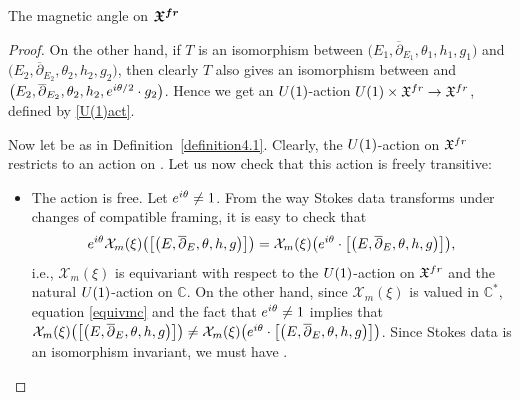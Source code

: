 \documentclass[11pt]{article}
\numberwithin{equation}{section}
\numberwithin{equation}{section}
\newcommand{\MC}{\mathcal{X}_m}
\begin{document}
\begin{subsubsection}{The magnetic angle on $\boldsymbol{\mathfrak{X}^{{\rm fr}}}$}
\begin{proof}
On the other hand, if $T$ is an isomorphism between $\bigl(E_1,\overline{\partial}_{E_1},\theta_1,h_1,g_1\bigr)$ and $\bigl(E_2,\overline{\partial}_{E_2},\theta_2,\allowbreak h_2, g_2\bigr)$, then clearly $T$ also gives an isomorphism between  and $ \smash{\bigl(E_2,\overline{\partial}_{E_2}},\allowbreak\theta_2, \smash{ h_2,{\rm e}^{{\rm i}\theta/2}\cdot g_2\bigr)}$. Hence we get an ${\rm U}(1)$-action ${\rm U}(1)\times \mathfrak{X}^{{\rm fr}}\to \mathfrak{X}^{{\rm fr}}$, defined by \eqref{U(1)act}.

Now let  be as in Definition~\ref{definition4.1}. Clearly, the ${\rm U}(1)$-action on $\mathfrak{X}^{{\rm fr}}$ restricts to an action on . Let us now check that this action is freely transitive:
\begin{itemize}\itemsep=0pt
 \item The action is free. Let ${\rm e}^{{\rm i}\theta}\neq 1$. From the way Stokes data transforms under changes of compatible framing, it is easy to check that
 \begin{equation}\label{equivmc}
 {\rm e}^{{\rm i}\theta}\MC(\xi)\bigl(\bigl[\bigl(E,\overline{\partial}_E,\theta,h,g\bigr)\bigr]\bigr)=\MC(\xi)\bigl({\rm e}^{{\rm i}\theta}\cdot \bigl[\bigl(E,\overline{\partial}_E,\theta,h,g\bigr)\bigr]\bigr),
 \end{equation}
 i.e., $\MC(\xi)$ is equivariant with respect to the ${\rm U}(1)$-action on $\mathfrak{X}^{{\rm fr}}$ and the natural ${\rm U}(1)$-action on $\mathbb{C}$. On the other hand, since $\MC(\xi)$ is valued in $\mathbb{C}^*$, equation \eqref{equivmc} and the fact that ${\rm e}^{{\rm i}\theta}\neq 1$ implies that $\MC(\xi)\bigl(\bigl[\bigl(E,\overline{\partial}_E,\theta,h,g\bigr)\bigr]\bigr)\neq \MC(\xi)\bigl({\rm e}^{{\rm i}\theta}\cdot\bigl[\bigl(E,\overline{\partial}_E,\theta,h,g\bigr)\bigr]\bigr)$. Since Stokes data is an isomorphism invariant, we must have .

\end{itemize}
\end{proof}
\end{subsubsection}
\end{document}
